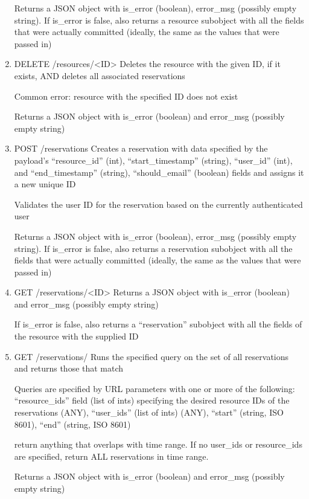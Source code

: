 \documentclass[12pt]{article}
\begin{document}
\begin{enumerate}
Returns a JSON object with is\_error (boolean), error\_msg (possibly empty string). If is\_error is false, also returns a resource subobject with all the fields that were actually committed (ideally, the same as the values that were passed in)

\item DELETE /resources/<ID>
Deletes the resource with the given ID, if it exists, AND deletes all associated reservations

Common error: resource with the specified ID does not exist

Returns a JSON object with is\_error (boolean) and error\_msg (possibly empty string)

\item POST /reservations
Creates a reservation with data specified by the payload's ``resource\_id'' (int), ``start\_timestamp'' (string), ``user\_id'' (int), and ``end\_timestamp'' (string), ``should\_email'' (boolean) fields and assigns it a new unique ID

Validates the user ID for the reservation based on the currently authenticated user

Returns a JSON object with is\_error (boolean), error\_msg (possibly empty string). If is\_error is false, also returns a reservation subobject with all the fields that were actually committed (ideally, the same as the values that were passed in)

\item GET /reservations/<ID>
Returns a JSON object with is\_error (boolean) and error\_msg (possibly empty string)

If is\_error is false, also returns a ``reservation'' subobject with all the fields of the resource with the supplied ID

\item GET /reservations/
Runs the specified query on the set of all reservations and returns those that match

Queries are specified by URL parameters with one or more of the following: ``resource\_ids'' field (list of ints) specifying the desired resource IDs of the reservations (ANY), ``user\_ids'' (list of ints) (ANY), ``start'' (string, ISO 8601), ``end'' (string, ISO 8601)

return anything that overlaps with time range. If no user\_ids or resource\_ids are specified, return ALL reservations in time range. 

Returns a JSON object with is\_error (boolean) and error\_msg (possibly empty string)


\end{enumerate}
\end{document}
